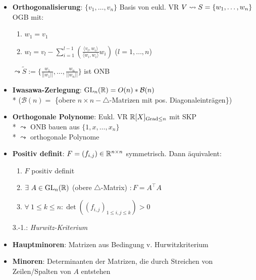\begin{itemize}
	\item \textbf{Orthogonalisierung}: \( \{ v_1, \dots, v_n \} \) Basis von eukl. VR \( V \\* \leadsto S = \{ w_1, \dots, w_n \} \) OGB mit:
		\begin{enumerate}
			\item \( w_1 = v_1 \)
			\item \( w_l = v_l - \sum_{i=1}^{l-1}\left( \tfrac{\langle v_l, w_i \rangle}{\langle w_i, w_i \rangle}w_i \right) \) (\( l = 1, \dots, n \))
		\end{enumerate}
		\( \leadsto \widetilde{S} := \{ \tfrac{w_1}{||w_1||}, \dots, \tfrac{w_n}{||w_n||} \} \) ist ONB

	\item \textbf{Iwasawa-Zerlegung}: \( \text{GL}_n(\mathbb{R}) = O(n)*\mathcal{B}(n) \) \\* (\( \mathcal{B}(n) = \) \{obere \( n \times n-\triangle\)-Matrizen mit pos. Diagonaleinträgen\})

	\item \textbf{Orthogonale Polynome}: Eukl. VR \( \mathbb{R}[X]_{\text{Grad} \leq n} \) mit SKP
		\\*
		\( \leadsto \) ONB bauen aus \( \{ 1, x, \dots, x_n \} \)
		\\*
		\( \leadsto \) orthogonale Polynome
	\item \textbf{Positiv definit}: \( F = (f_{i,j}) \in \mathbb{R}^{n \times n} \) symmetrisch. Dann äquivalent:
		\begin{enumerate}
			\item \( F \) positiv definit
			\item \( \exists \ A \in \text{GL}_n(\mathbb{R}) \) (obere \( \triangle \)-Matrix) \( : F = A^\top A \)
			\item \( \forall \ 1 \leq k \leq n: \det((f_{i,j})_{1 \leq i,j \leq k}) > 0 \)
		\end{enumerate}
		3.-1.: \emph{Hurwitz-Kriterium}

	\item \textbf{Hauptminoren}: Matrizen aus Bedingung v. Hurwitzkriterium
	\item \textbf{Minoren}: Determinanten der Matrizen, die durch Streichen von Zeilen/Spalten von \( A \) entstehen
\end{itemize}

